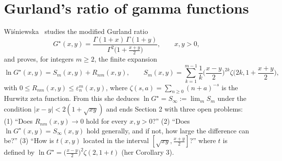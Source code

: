 \section{Gurland's ratio of gamma functions}\label{sec:gurland}

Wi\'sniewska~\cite{Wis} studies the modified Gurland ratio
\[
G^\star(x,y)=\frac{\Gamma(1+x)\,\Gamma(1+y)}{\Gamma^2\!\big(1+\frac{x+y}2\big)},\qquad x,y>0,
\]
and proves, for integers $m\ge2$, the finite expansion
\[
\ln G^\star(x,y)=S_m(x,y)+R_{nm}(x,y),\qquad S_m(x,y)=\sum_{k=1}^{m-1}\frac1k\Big(\frac{x-y}2\Big)^{2k}\zeta\Big(2k,1+\frac{x+y}2\Big),
\]
with $0\le R_{nm}(x,y)\le\varepsilon_n^m(x,y)$, where $\zeta(s,a)=\sum_{n\ge0}(n+a)^{-s}$ is the Hurwitz zeta function. From this she deduces $\ln G^\star=S_\infty:=\lim_mS_m$ under the condition $|x-y|<2(1+\sqrt{xy})$ and ends Section 2 with three open problems: (1) ``Does $R_{nm}(x,y)\to0$ hold for every $x,y>0$?'' (2) ``Does $\ln G^\star(x,y)=S_\infty(x,y)$ hold generally, and if not, how large the difference can be?'' (3) ``How is $t(x,y)$ located in the interval $[\sqrt{xy},\frac{x+y}2]$?'' where $t$ is defined by $\ln G^\star=\big(\frac{x-y}2\big)^2\zeta(2,1+t)$ (her Corollary 3).

